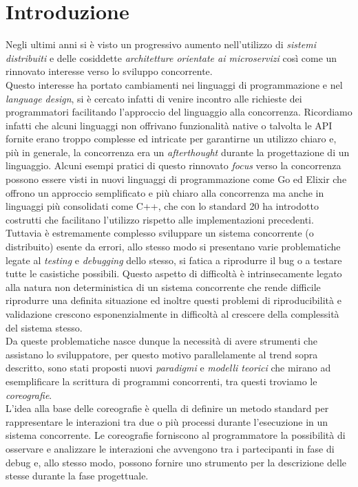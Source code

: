 \chapter{Introduzione}
Negli ultimi anni si è visto un progressivo aumento nell'utilizzo di \emph{sistemi distribuiti} e delle cosiddette \emph{architetture orientate ai microservizi} così come un rinnovato interesse verso lo sviluppo concorrente.\\
Questo interesse ha portato cambiamenti nei linguaggi di programmazione e nel \emph{language design}, si è cercato infatti di venire incontro alle richieste dei programmatori facilitando l'approccio del linguaggio alla concorrenza. Ricordiamo infatti che alcuni linguaggi non offrivano funzionalità native o talvolta le API fornite erano troppo complesse ed intricate per garantirne un utilizzo chiaro e, più in generale, la concorrenza era un \emph{afterthought} durante la progettazione di un linguaggio. Alcuni esempi pratici di questo rinnovato \emph{focus} verso la concorrenza possono essere visti in nuovi linguaggi di programmazione come Go\cite{Golang} ed Elixir\cite{Elixir} che offrono un approccio semplificato e più chiaro alla concorrenza ma anche in linguaggi più consolidati come C++\cite{C_Plus_Plus}, che con lo standard 20 ha introdotto costrutti che facilitano l'utilizzo rispetto alle implementazioni precedenti.\bigskip \\
Tuttavia è estremamente complesso sviluppare un sistema concorrente (o distribuito) esente da errori, allo stesso modo si presentano varie problematiche legate al \emph{testing} e \emph{debugging} dello stesso, si fatica a riprodurre il bug o a testare tutte le casistiche possibili. Questo aspetto di difficoltà è intrinsecamente legato alla natura non deterministica di un sistema concorrente che rende difficile riprodurre una definita situazione ed inoltre questi problemi di riproducibilità e validazione crescono esponenzialmente in difficoltà al crescere della complessità del sistema stesso.\bigskip \\
Da queste problematiche nasce dunque la necessità di avere strumenti che assistano lo sviluppatore, per questo motivo parallelamente al trend sopra descritto, sono stati proposti nuovi \emph{paradigmi} e \emph{modelli teorici} che mirano ad esemplificare la scrittura di programmi concorrenti, tra questi troviamo le \emph{coreografie}\cite{Choreographies}.\\
L'idea alla base delle coreografie è quella di definire un metodo standard per rappresentare le interazioni tra due o più processi durante l'esecuzione in un sistema concorrente. Le coreografie forniscono al programmatore la possibilità di osservare e analizzare le interazioni che avvengono tra i partecipanti in fase di debug e, allo stesso modo, possono fornire uno strumento per la descrizione delle stesse durante la fase progettuale.\bigskip \\
